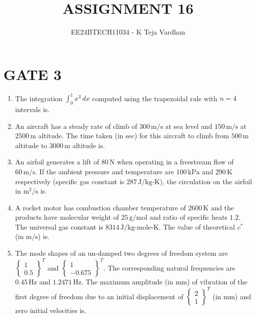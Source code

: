 \documentclass[journal]{IEEEtran}
\begin{document}

\title{ASSIGNMENT 16}
\author{EE24BTECH11034 - K Teja Vardhan}
{\let\newpage\relax\maketitle}

\section{GATE 3}
\begin{enumerate}

    \item The integration $ \int_0^1 x^3 \, dx $ computed using the trapezoidal rule with $ n = 4 $ intervals is.
    
    \item An aircraft has a steady rate of climb of $300 \, \text{m/s}$ at sea level and $150 \, \text{m/s}$ at $2500 \, \text{m}$ altitude. The time taken (in sec) for this aircraft to climb from $500 \, \text{m}$ altitude to $3000 \, \text{m}$ altitude is.
    
    \item An airfoil generates a lift of $80 \, \text{N}$ when operating in a freestream flow of $60 \, \text{m/s}$. If the ambient pressure and temperature are $100 \, \text{kPa}$ and $290 \, \text{K}$ respectively (specific gas constant is $287 \, \text{J/kg-K}$), the circulation on the airfoil in $ \text{m}^2/\text{s} $ is.
    
    \item A rocket motor has combustion chamber temperature of $2600 \, \text{K}$ and the products have molecular weight of $25 \, \text{g/mol}$ and ratio of specific heats $1.2$. The universal gas constant is $8314 \, \text{J/kg-mole-K}$. The value of theoretical $ c^* $ (in m/s) is.
    
    \item The mode shapes of an un-damped two degrees of freedom system are $ \begin{Bmatrix} 1 \\ 0.5 \end{Bmatrix}^T $ and $ \begin{Bmatrix} 1 \\ -0.675 \end{Bmatrix}^T $. The corresponding natural frequencies are $0.45 \, \text{Hz}$ and $1.2471 \, \text{Hz}$. The maximum amplitude (in mm) of vibration of the first degree of freedom due to an initial displacement of $ \begin{Bmatrix} 2 \\ 1 \end{Bmatrix}^T $ (in mm) and zero initial velocities is.
    

\end{enumerate}
\end{document}
